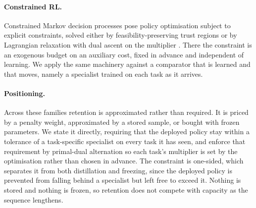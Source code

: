 \paragraph{Constrained RL.}
Constrained Markov decision processes \citep{altman1999cmdp} pose policy
optimisation subject to explicit constraints, solved either by
feasibility-preserving trust regions \citep{achiam2017cpo} or by Lagrangian
relaxation with dual ascent on the multiplier \citep{tessler2019rcpo}. There
the constraint is an exogenous budget on an auxiliary cost, fixed in advance
and independent of learning. We apply the same machinery against a comparator
that is learned and that moves, namely a specialist trained on each task as it
arrives.

\paragraph{Positioning.}
Across these families retention is approximated rather than required. It is
priced by a penalty weight, approximated by a stored sample, or bought with
frozen parameters. We state it directly, requiring that the deployed policy
stay within a tolerance of a task-specific specialist on every task it has
seen, and enforce that requirement by primal-dual alternation so each task's
multiplier is set by the optimisation rather than chosen in advance. The
constraint is one-sided, which separates it from both distillation and
freezing, since the deployed policy is prevented from falling behind a
specialist but left free to exceed it. Nothing is stored and nothing is frozen,
so retention does not compete with capacity as the sequence lengthens.

